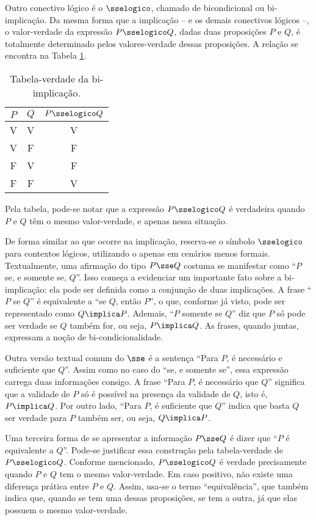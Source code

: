 Outro conectivo lógico é o $\sselogico$, chamado de bicondicional ou bi-implicação.
Da mesma forma que a implicação -- e os demais conectivos lógicos --, o valor-verdade da expressão $P \sselogico Q$, dadas duas proposições $P$ e $Q$, é totalmente determinado pelos valores-verdade dessas proposições.
A relação se encontra na Tabela \ref{tbl:bi-implicacao}.

\begin{table}[h]
	\centering
	\begin{tabular}{cc|c}
		$P$		& $Q$		& $P \sselogico Q$	\\ \hline
		V		& V			& V			\\
		V		& F			& F			\\
		F		& V			& F			\\
		F		& F			& V			\\	
	\end{tabular}
	\caption{Tabela-verdade da bi-implicação.}
	\label{tbl:bi-implicacao}
\end{table}

Pela tabela, pode-se notar que a expressão $P \sselogico Q$ é verdadeira quando $P$ e $Q$ têm o mesmo valor-verdade, e apenas nessa situação.

De forma similar ao que ocorre na implicação, reserva-se o símbolo $\sselogico$ para contextos lógicos, utilizando o \entreaspas{$\sse$} apenas em cenários menos formais. Textualmente, uma afirmação do tipo $P \sse Q$ costuma se manifestar como ``$P$ se, e somente se, $Q$''. Isso começa a evidenciar um importante fato sobre a bi-implicação: ela pode ser definida como a conjunção de duas implicações. A frase ``$P$ se $Q$'' é equivalente a ``se $Q$, então $P$'', o que, conforme já visto, pode ser representado como $Q \implica P$. Ademais, ``$P$ somente se $Q$'' diz que $P$ só pode ser verdade se $Q$ também for, ou seja, $P \implica Q$. As frases, quando juntas, expressam a noção de bi-condicionalidade.

Outra versão textual comum do $\sse$ é a sentença ``Para $P$, é necessário e suficiente que $Q$''. Assim como no caso do ``se, e somente se'', essa expressão carrega duas informações consigo. A frase ``Para $P$, é necessário que $Q$'' significa que a validade de $P$ só é possível na presença da validade de $Q$, isto é, $P \implica Q$. Por outro lado, ``Para $P$, é suficiente que $Q$'' indica que basta $Q$ ser verdade para $P$ também ser, ou seja, $Q \implica P$.

Uma terceira forma de se apresentar a informação $P \sse Q$ é dizer que ``$P$ é equivalente a $Q$''. Pode-se justificar essa construção pela tabela-verdade de $P \sselogico Q$. Conforme mencionado, $P \sselogico Q$ é verdade precisamente quando $P$ e $Q$ tem o mesmo valor-verdade. Em caso positivo, não existe uma diferença prática entre $P$ e $Q$. Assim, usa-se o termo ``equivalência'', que também indica que, quando se tem uma dessas proposições, se tem a outra, já que elas possuem o mesmo valor-verdade.

